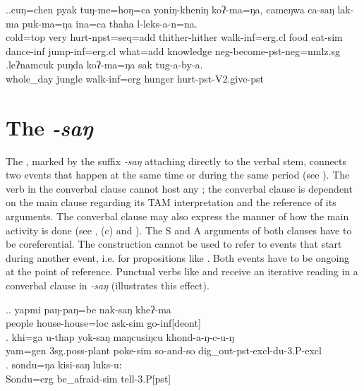 \ex.\ag.\label{cungchen}cuŋ=chen   pyak  tuŋ-me=hoŋ=ca yoniŋ-kheniŋ  koʔ-ma=ŋa, cameŋwa  ca-saŋ  lak-ma      puk-ma=ŋa  ina=ca   thaha l-leks-a-n=na.\\
cold{\sc =top} very hurt{\sc -npst=seq=add} thither-hither walk{\sc -inf=erg.cl} food eat{\sc -sim} dance{\sc -inf} jump{\sc -inf=erg.cl} what{\sc =add} knowledge {\sc neg-}become{\sc -pst-neg=nmlz.sg}\\
  
\bg.leʔnamcuk     puŋda koʔ-ma=ŋa         sak    tug-a-by-a.\\
whole\_day jungle walk{\sc -inf=erg} hunger hurt{\sc [3sg]-pst-V2.give-pst}\\
 

		
\section{The  \emph{-saŋ}}\label{sim}

The , marked by the suffix \emph{-saŋ} attaching directly to the verbal stem, connects two events that happen at the same time or during the same period (see \Next[a]). The verb in the converbal clause cannot host any ; the converbal clause is dependent on the main clause regarding its TAM interpretation and the reference of its arguments. The converbal clause may also express the manner of how the main activity is done (see \Next[b], (c) and \NNext).  The S and A arguments of both clauses have to be coreferential. The construction cannot be used to refer to events that start during another event, i.e. for propositions like . Both events have to be ongoing at the point of reference. Punctual verbs like  and  receive an iterative reading in a converbal clause in \emph{-saŋ} (\Next[b] illustrates this effect).

		 \ex.\ag. yapmi  paŋ-paŋ=be nak-saŋ kheʔ-ma\\
		people   house-house{\sc =loc} ask{\sc -sim} go{\sc -inf[deont]}\\
	 
	\bg.	khi=ga u-thap yok-saŋ maŋcusiŋcu khond-a-ŋ-c-u-ŋ\\
			yam{\sc =gen} {\sc 3sg.poss-}plant   poke-{\sc sim} so-and-so dig\_out{\sc -pst-excl-du-3.P-excl}\\
			  
	\bg. sondu=ŋa    kisi-saŋ             luks-u:	\\
	Sondu{\sc =erg} be\_afraid{\sc -sim} tell{\sc -3.P[pst]}\\


